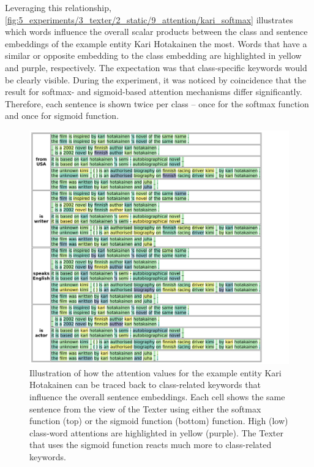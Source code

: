 Leveraging this relationship, \autoref{fig:5_experiments/3_texter/2_static/9_attention/kari_softmax} illustrates which words influence the overall scalar products between the class and sentence embeddings of the example entity Kari Hotakainen the most. Words that have a similar or opposite embedding to the class embedding are highlighted in yellow and purple, respectively. The expectation was that class-specific keywords would be clearly visible. During the experiment, it was noticed by coincidence that the result for softmax- and sigmoid-based attention mechanisms differ significantly. Therefore, each sentence is shown twice per class -- once for the softmax function and once for sigmoid function.

\begin{figure}
    \centering
    \includegraphics[width=\textwidth]{5_experiments/3_texter/2_static/9_attention/kari_softmax}
    \caption{Illustration of how the attention values for the example entity Kari Hotakainen can be traced back to class-related keywords that influence the overall sentence embeddings. Each cell shows the same sentence from the view of the Texter using either the softmax function (top) or the sigmoid function (bottom) function. High (low) class-word attentions are highlighted in yellow (purple). The Texter that uses the sigmoid function reacts much more to class-related keywords.}
    \label{fig:5_experiments/3_texter/2_static/9_attention/kari_softmax}
\end{figure}

